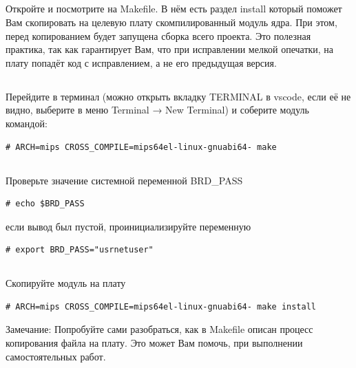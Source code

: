 \subsection{} Откройте и посмотрите на Makefile. В нём есть раздел install который поможет Вам скопировать на целевую плату скомпилированный модуль ядра. При этом, перед копированием будет запущена сборка всего проекта. Это полезная практика, так как гарантирует Вам, что при исправлении мелкой опечатки, на плату попадёт код с исправлением, а не его предыдущая версия.

\subsection{} Перейдите в терминал (можно открыть вкладку TERMINAL в vscode, если её не видно, выберите в меню Terminal → New Terminal) и соберите модуль командой:
\begin{lstlisting}[style=bash]
# ARCH=mips CROSS_COMPILE=mips64el-linux-gnuabi64- make 
\end{lstlisting}

\subsection{} Проверьте значение системной переменной BRD\_PASS  
\begin{lstlisting}[style=bash]
# echo $BRD_PASS
\end{lstlisting}
если вывод был пустой, проинициализируйте переменную 
\begin{lstlisting}[style=bash]
# export BRD_PASS="usrnetuser" 
\end{lstlisting}

\subsection{}Скопируйте модуль на плату
\begin{lstlisting}[style=bash]
	# ARCH=mips CROSS_COMPILE=mips64el-linux-gnuabi64- make install
\end{lstlisting}
\begin{Notes}{Замечание:}
	Попробуйте сами разобраться, как в Makefile описан процесс копирования файла на плату. Это может Вам помочь, при выполнении самостоятельных работ.
\end{Notes}

